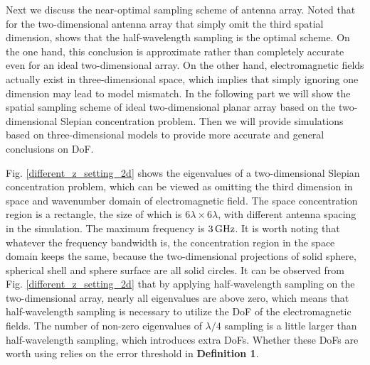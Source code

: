 \documentclass[12pt,draftclsnofoot,journal,onecolumn]{IEEEtran}
\begin{document}
		
	Next we discuss the near-optimal sampling scheme of antenna array. Noted that for the two-dimensional antenna array that simply omit the third spatial dimension, \cite{pizzo2022nyquist} shows that the half-wavelength sampling is the optimal scheme. On the one hand, this conclusion is approximate rather than completely accurate even for an ideal two-dimensional array. On the other hand, electromagnetic fields actually exist in three-dimensional space, which implies that simply ignoring one dimension may lead to model mismatch. In the following part we will show the spatial sampling scheme of ideal two-dimensional planar array based on the two-dimensional Slepian concentration problem. Then we will provide simulations based on three-dimensional models to provide more accurate and general conclusions on DoF.
		
		Fig. \ref{different_z_setting_2d} shows the eigenvalues of a two-dimensional Slepian concentration problem, which can be viewed as omitting the third dimension in space and wavenumber domain of electromagnetic field. The space concentration region is a rectangle, the size of which is $6\lambda \times 6\lambda$, with different antenna spacing in the simulation. The maximum frequency is $3\,{\rm GHz}$. It is worth noting that whatever the frequency bandwidth is, the concentration region in the space domain keeps the same, because the two-dimensional projections of solid sphere, spherical shell and sphere surface are all solid circles. 
		 It can be observed from Fig. \ref{different_z_setting_2d} that by applying half-wavelength sampling on the two-dimensional array, nearly all eigenvalues are above zero, which means that half-wavelength sampling is necessary to utilize the DoF of the electromagnetic fields. The number of non-zero eigenvalues of $\lambda/4$ sampling is a little larger than half-wavelength sampling, which introduces extra DoFs. Whether these DoFs are worth using relies on the error threshold in {\bf Definition 1}.
		 
\end{document}

